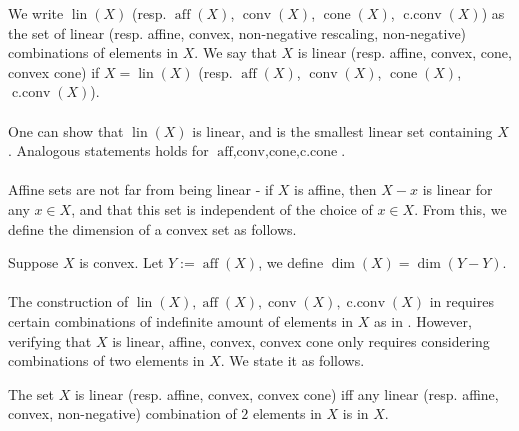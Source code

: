 \begin{defn}\label{defn:011-hull}
	We write $\operatorname{lin}(X)$ (resp. $\operatorname{aff}(X)$, $\operatorname{conv}(X)$, $\operatorname{cone}(X)$, $\operatorname{c.conv}(X)$) as the set of linear (resp. affine, convex, non-negative rescaling, non-negative) combinations of elements in $X$. We say that $X$ is linear (resp. affine, convex, cone, convex cone) if $X=\operatorname{lin}(X)$ (resp. $\operatorname{aff}(X)$, $\operatorname{conv}(X)$, $\operatorname{cone}(X)$, $\operatorname{c.conv}(X)$).
\end{defn}

\paragraph{}One can show that $\operatorname{lin}(X)$ is linear, and is the smallest linear set containing $X$. Analogous statements holds for $\operatorname{aff,conv,cone,c.cone}$.

\paragraph{}Affine sets are not far from being linear - if $X$ is affine, then $X-x$ is linear for any $x\in X$, and that this set is independent of the choice of $x\in X$. From this, we define the dimension of a convex set as follows.

\begin{defn}[Dimension]\label{defn:011-dim}
	Suppose $X$ is convex. Let $Y:=\operatorname{aff}(X)$, we define $\dim(X)=\operatorname{dim}(Y-Y)$.
\end{defn}

\paragraph{}The construction of $\operatorname{lin}(X),\operatorname{aff}(X),\operatorname{conv}(X),\operatorname{c.conv}(X)$ in  requires certain combinations of indefinite amount of elements in $X$ as in . However, verifying that $X$ is linear, affine, convex, convex cone only requires considering combinations of two elements in $X$. We state it as follows.

\begin{prop}\label{prop:011-bi}
	The set $X$ is linear (resp. affine, convex, convex cone) iff any linear (resp. affine, convex, non-negative) combination of $2$ elements in $X$ is in $X$.
\end{prop}

